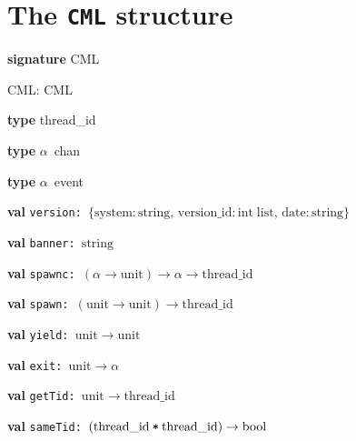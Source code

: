 \section{The {\tt CML} structure}



\begin{synopsis}
\item {\textbf{signature}} CML\label{sig-CML}
\item {\STRUCTURE} CML: CML\label{str-CML}
\end{synopsis}

\begin{interface}
\item {}{\textbf{type}} thread\_\linebreak[0]id
\item {}{\textbf{type}} \(\alpha\)~chan
\item {}{\textbf{type}} \(\alpha\)~event
\item {}{\textbf{val}} {\tt version: \(\{\mathrm{system}:\mathrm{string},\,\mathrm{version\_id}:\mathrm{int}\;\mathrm{list},\,\mathrm{date}:\mathrm{string}\}\)}

\item {}{\textbf{val}} {\tt banner: \(\mathrm{string}\)}

\item {}{\textbf{val}} {\tt spawnc: \((\alpha\rightarrow \mathrm{unit})\rightarrow \alpha\rightarrow \mathrm{thread\_id}\)}

\item {}{\textbf{val}} {\tt spawn: \((\mathrm{unit}\rightarrow \mathrm{unit})\rightarrow \mathrm{thread\_id}\)}

\item {}{\textbf{val}} {\tt yield: \(\mathrm{unit}\rightarrow \mathrm{unit}\)}

\item {}{\textbf{val}} {\tt exit: \(\mathrm{unit}\rightarrow \alpha\)}

\item {}{\textbf{val}} {\tt getTid: \(\mathrm{unit}\rightarrow \mathrm{thread\_id}\)}

\item {}{\textbf{val}} {\tt sameTid: \((\mathrm{thread\_id}\:\verb,*,\:\mathrm{thread\_id})\rightarrow \mathrm{bool}\)}


\end{interface}
